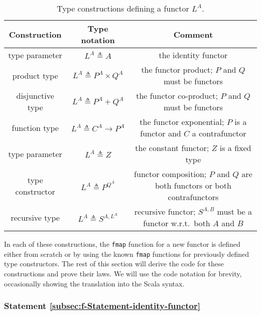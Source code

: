 \begin{table}
\begin{centering}
\begin{tabular}{|c|c|c|}
\hline 
\textbf{\small{}Construction} & \textbf{\small{}Type notation} & \textbf{\small{}Comment}\tabularnewline
\hline 
\hline 
{\footnotesize{}type parameter} & {\footnotesize{}$L^{A}\triangleq A$} & {\footnotesize{}the identity functor}\tabularnewline
\hline 
{\footnotesize{}product type} & {\footnotesize{}$L^{A}\triangleq P^{A}\times Q^{A}$} & {\footnotesize{}the functor product; $P$ and $Q$ must be functors}\tabularnewline
\hline 
{\footnotesize{}disjunctive type} & {\footnotesize{}$L^{A}\triangleq P^{A}+Q^{A}$} & {\footnotesize{}the functor co-product; $P$ and $Q$ must be functors}\tabularnewline
\hline 
{\footnotesize{}function type} & {\footnotesize{}$L^{A}\triangleq C^{A}\rightarrow P^{A}$} & {\footnotesize{}the functor exponential; $P$ is a functor and $C$
a contrafunctor}\tabularnewline
\hline 
{\footnotesize{}type parameter} & {\footnotesize{}$L^{A}\triangleq Z$} & {\footnotesize{}the constant functor; $Z$ is a fixed type}\tabularnewline
\hline 
{\footnotesize{}type constructor} & {\footnotesize{}$L^{A}\triangleq P^{Q^{A}}$} & {\footnotesize{}functor composition; $P$ and $Q$ are both functors
or both contrafunctors}\tabularnewline
\hline 
{\footnotesize{}recursive type} & {\footnotesize{}$L^{A}\triangleq S^{A,L^{A}}$} & {\footnotesize{}recursive functor; $S^{A,B}$ must be a functor w.r.t.~both
$A$ and $B$}\tabularnewline
\hline 
\end{tabular}
\par\end{centering}
\caption{Type constructions defining a functor $L^{A}$.\label{tab:f-Functor-constructions}}
\end{table}

In each of these constructions, the \lstinline!fmap! function for
a new functor is defined either from scratch or by using the known
\lstinline!fmap! functions for previously defined type constructors.
The rest of this section will derive the code for these constructions
and prove their laws. We will use the code notation for brevity, occasionally
showing the translation into the Scala syntax.

\subsubsection{Statement \label{subsec:f-Statement-identity-functor}\ref{subsec:f-Statement-identity-functor}}

